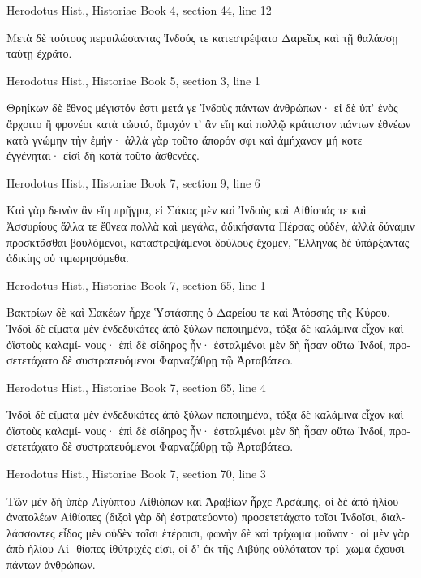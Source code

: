 \documentclass[12pt,letterpaper,twoside,final]{memoir}
\begin{document}
\begin{greek}
Herodotus Hist., Historiae 
Book 4, section 44, line 12

                                                         Μετὰ 
δὲ τούτους περιπλώσαντας Ἰνδούς τε κατεστρέψατο 
Δαρεῖος καὶ τῇ θαλάσσῃ ταύτῃ ἐχρᾶτο. 



Herodotus Hist., Historiae 
Book 5, section 3, line 1

Θρηίκων δὲ ἔθνος μέγιστόν ἐστι μετά γε Ἰνδοὺς πάντων 
ἀνθρώπων· εἰ δὲ ὑπ' ἑνὸς ἄρχοιτο ἢ φρονέοι κατὰ τὠυτό, 
ἄμαχόν τ' ἂν εἴη καὶ πολλῷ κράτιστον πάντων ἐθνέων κατὰ 
γνώμην τὴν ἐμήν· ἀλλὰ γὰρ τοῦτο ἄπορόν σφι καὶ ἀμήχανον 
μή κοτε ἐγγένηται· εἰσὶ δὴ κατὰ τοῦτο ἀσθενέες. 



Herodotus Hist., Historiae 
Book 7, section 9, line 6

                                                   Καὶ γὰρ δεινὸν 
ἂν εἴη πρῆγμα, εἰ Σάκας μὲν καὶ Ἰνδοὺς καὶ Αἰθίοπάς τε 
καὶ Ἀσσυρίους ἄλλα τε ἔθνεα πολλὰ καὶ μεγάλα, ἀδικήσαντα 
Πέρσας οὐδέν, ἀλλὰ δύναμιν προσκτᾶσθαι βουλόμενοι, 
καταστρεψάμενοι δούλους ἔχομεν, Ἕλληνας δὲ ὑπάρξαντας 
ἀδικίης οὐ τιμωρησόμεθα. 



Herodotus Hist., Historiae 
Book 7, section 65, line 1

                                                   Βακτρίων 
δὲ καὶ Σακέων ἦρχε Ὑστάσπης ὁ Δαρείου τε καὶ Ἀτόσσης 
τῆς Κύρου. Ἰνδοὶ δὲ εἵματα μὲν ἐνδεδυκότες ἀπὸ ξύλων 
πεποιημένα, τόξα δὲ καλάμινα εἶχον καὶ ὀϊστοὺς καλαμί-
νους· ἐπὶ δὲ σίδηρος ἦν· ἐσταλμένοι μὲν δὴ ἦσαν οὕτω 
Ἰνδοί, προσετετάχατο δὲ συστρατευόμενοι Φαρναζάθρῃ τῷ 
Ἀρταβάτεω. 



Herodotus Hist., Historiae 
Book 7, section 65, line 4

              Ἰνδοὶ δὲ εἵματα μὲν ἐνδεδυκότες ἀπὸ ξύλων 
πεποιημένα, τόξα δὲ καλάμινα εἶχον καὶ ὀϊστοὺς καλαμί-
νους· ἐπὶ δὲ σίδηρος ἦν· ἐσταλμένοι μὲν δὴ ἦσαν οὕτω 
Ἰνδοί, προσετετάχατο δὲ συστρατευόμενοι Φαρναζάθρῃ τῷ 
Ἀρταβάτεω. 



Herodotus Hist., Historiae 
Book 7, section 70, line 3

             Τῶν μὲν δὴ ὑπὲρ Αἰγύπτου Αἰθιόπων καὶ 
Ἀραβίων ἦρχε Ἀρσάμης, οἱ δὲ ἀπὸ ἡλίου ἀνατολέων 
Αἰθίοπες (διξοὶ γὰρ δὴ ἐστρατεύοντο) προσετετάχατο τοῖσι 
Ἰνδοῖσι, διαλλάσσοντες εἶδος μὲν οὐδὲν τοῖσι ἑτέροισι, 
φωνὴν δὲ καὶ τρίχωμα μοῦνον· οἱ μὲν γὰρ ἀπὸ ἡλίου Αἰ-
θίοπες ἰθύτριχές εἰσι, οἱ δ' ἐκ τῆς Λιβύης οὐλότατον τρί-
χωμα ἔχουσι πάντων ἀνθρώπων. 




\end{greek}
\end{document}
